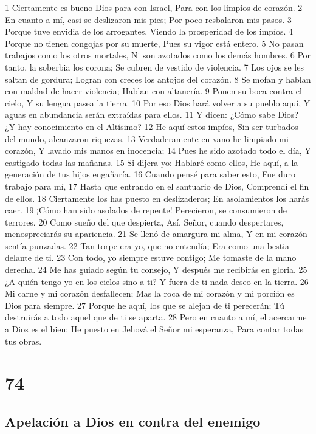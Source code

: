 1 Ciertamente es bueno Dios para con Israel,
Para con los limpios de corazón.
2 En cuanto a mí, casi se deslizaron mis pies;
Por poco resbalaron mis pasos.
3 Porque tuve envidia de los arrogantes,
Viendo la prosperidad de los impíos.
4 Porque no tienen congojas por su muerte,
Pues su vigor está entero.
5 No pasan trabajos como los otros mortales,
Ni son azotados como los demás hombres.
6 Por tanto, la soberbia los corona;
Se cubren de vestido de violencia.
7 Los ojos se les saltan de gordura;
Logran con creces los antojos del corazón.
8 Se mofan y hablan con maldad de hacer violencia;
Hablan con altanería.
9 Ponen su boca contra el cielo,
Y su lengua pasea la tierra.
10 Por eso Dios hará volver a su pueblo aquí,
Y aguas en abundancia serán extraídas para ellos.
11 Y dicen: ¿Cómo sabe Dios?
¿Y hay conocimiento en el Altísimo?
12 He aquí estos impíos,
Sin ser turbados del mundo, alcanzaron riquezas.
13 Verdaderamente en vano he limpiado mi corazón,
Y lavado mis manos en inocencia;
14 Pues he sido azotado todo el día,
Y castigado todas las mañanas.
15 Si dijera yo: Hablaré como ellos,
He aquí, a la generación de tus hijos engañaría.
16 Cuando pensé para saber esto,
Fue duro trabajo para mí,
17 Hasta que entrando en el santuario de Dios,
Comprendí el fin de ellos.
18 Ciertamente los has puesto en deslizaderos;
En asolamientos los harás caer.
19 ¡Cómo han sido asolados de repente!
Perecieron, se consumieron de terrores.
20 Como sueño del que despierta,
Así, Señor, cuando despertares, menospreciarás su apariencia.
21 Se llenó de amargura mi alma,
Y en mi corazón sentía punzadas.
22 Tan torpe era yo, que no entendía;
Era como una bestia delante de ti.
23 Con todo, yo siempre estuve contigo;
Me tomaste de la mano derecha.
24 Me has guiado según tu consejo,
Y después me recibirás en gloria.
25 ¿A quién tengo yo en los cielos sino a ti?
Y fuera de ti nada deseo en la tierra.
26 Mi carne y mi corazón desfallecen;
Mas la roca de mi corazón y mi porción es Dios para siempre.
27 Porque he aquí, los que se alejan de ti perecerán;
Tú destruirás a todo aquel que de ti se aparta.
28 Pero en cuanto a mí, el acercarme a Dios es el bien;
He puesto en Jehová el Señor mi esperanza,
Para contar todas tus obras.

\chapter{74}

\section*{Apelación a Dios en contra del enemigo}

